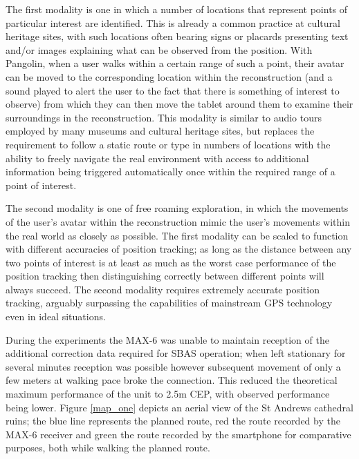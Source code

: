 The first modality is one in which a number of locations that represent points of particular interest are identified. This is already a common practice at cultural heritage sites, with such locations often bearing signs or placards presenting text and/or images explaining what can be observed from the position. With Pangolin, when a user walks within a certain range of such a point, their avatar can be moved to the corresponding location within the reconstruction (and a sound played to alert the user to the fact that there is something of interest to observe) from which they can then move the tablet around them to examine their surroundings in the reconstruction. This modality is similar to audio tours employed by many museums and cultural heritage sites, but replaces the requirement to follow a static route or type in numbers of locations with the ability to freely navigate the real environment with access to additional information being triggered automatically once within the required range of a point of interest.

The second modality is one of free roaming exploration, in which the movements of the user's avatar within the reconstruction mimic the user's movements within the real world as closely as possible.
The first modality can be scaled to function with different accuracies of position tracking; as long as the distance between any two points of interest is at least as much as the worst case performance of the position tracking then distinguishing correctly between different points will always succeed. The second modality requires extremely accurate position tracking, arguably surpassing the capabilities of mainstream GPS technology even in ideal situations.

During the experiments the MAX-6 was unable to maintain reception of the additional correction data required for SBAS operation; when left stationary for several minutes reception was possible however subsequent movement of only a few meters at walking pace broke the connection. This reduced the theoretical maximum performance of the unit to 2.5m CEP, with observed performance being lower. Figure \ref{map_one} depicts an aerial view of the St Andrews cathedral ruins; the blue line represents the planned route, red the route recorded by the MAX-6 receiver and green the route recorded by the smartphone for comparative purposes, both while walking the planned route.



